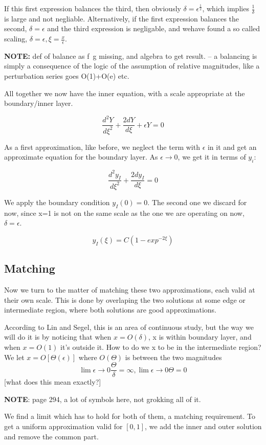 \documentclass[12pt]{report}
\begin{document}
If this first expression balances the third, then obviously $\delta =
\epsilon^{\frac 1 2}$, which implies $\frac 1 \delta$ is large and not
negliable. Alternatively, if the first expression balances the second,
$\delta = \epsilon$ and the third expression is negligable, and wehave
found a so called scaling, $\delta = \epsilon, \xi=\frac x \epsilon$.

\textbf{NOTE:} def of balance as f~g missing, and algebra to get
result. -- a balancing is simply a consequence of the logic of the assumption of relative magnitudes, like a perturbation series goes O(1)+O(e) etc.

All together we now have the inner equation, with a scale appropriate
at the boundary/inner layer.

$$\frac{d^2Y}{d\xi^2} + \frac{2dY}{d\xi} + \epsilon Y = 0$$

As a first approximation, like before, we neglect the term with
$\epsilon$ in it and get an approximate equation for the boundary
layer. As $\epsilon \to 0$, we get it in terms of $y_i$:

$$\frac{d^2y_I}{d\xi^2} + \frac{2dy_I}{d\xi} = 0$$

We apply the boundary condition $y_I(0) = 0$. The second one we
discard for now, since x=1 is not on the same scale as the one we are
operating on now, $\delta=\epsilon$.

$$y_I(\xi) = C(1-exp^{-2\xi})$$

\subsection{Matching}

Now we turn to the matter of matching these two approximations, each
valid at their own scale. This is done by overlaping the two solutions
at some edge or intermediate region, where both solutions are good
approximations.

According to Lin and Segel, this is an area of continuous study, but
the way we will do it is by noticing that when $x=O(\delta)$, x is
within boundary layer, and when $x=O(1)$ it's outside it. How to do we
x to be in the intermediate region? We let $x=O[\Theta(\epsilon)]$
where $O(\Theta)$ is between the two magnitudes $$\lim \epsilon \to 0 \frac \Theta \delta = \infty, \lim \epsilon \to
0 \Theta = 0$$ [what does this mean exactly?]

\textbf{NOTE}:  page 294, a lot of symbols here, not grokking all of it.

We find a limit which has to hold for both of them, a matching
requirement. To get a uniform approximation valid for $[0,1]$, we add the
inner and outer solution and remove the common part.
\end{document}
